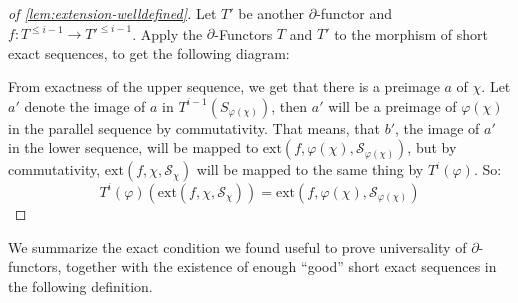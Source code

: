 \begin{proof}[of \cref{lem:extension-welldefined}]
  Let $T'$ be another $\partial$-functor and $f:T^{\leq i-1}\to T'^{\leq i-1}$.
  Apply the $\partial$-Functors $T$ and $T'$ to the morphism of short exact sequences,
  to get the following diagram:
  \begin{center}
  \end{center}
  From exactness of the upper sequence, we get that there is a preimage $a$ of $\chi$.
  Let $a'$ denote the image of $a$ in $T^{i-1}(S_{\varphi(\chi)})$,
  then $a'$ will be a preimage of ${\varphi(\chi)}$ in the parallel sequence by commutativity.
  That means, that $b'$, the image of $a'$ in the lower sequence,
  will be mapped to $ \mathrm{ext}(f,\varphi(\chi),\mathcal{S}_{\varphi(\chi)})$,
  but by commutativity, $\mathrm{ext}(f,\chi,\mathcal{S}_\chi)$ will be mapped to the same thing by $T^i(\varphi)$.
  So:
  \[ T^i(\varphi)(\mathrm{ext}(f,\chi,\mathcal{S}_\chi))=\mathrm{ext}(f,\varphi(\chi),\mathcal{S}_{\varphi(\chi)})\]  
\end{proof}

We summarize the exact condition we found useful to prove universality of $\partial$-functors,
together with the existence of enough ``good'' short exact sequences in the following definition.

